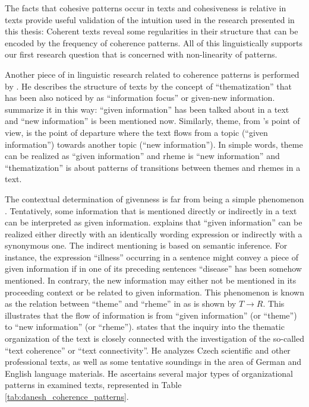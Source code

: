 The facts that cohesive patterns occur in texts and cohesiveness is relative in texts provide useful validation of the intuition used in the research presented in this thesis: Coherent texts reveal some regularities in their structure that can be encoded by the frequency of coherence patterns. 
All of this linguistically supports our first research question that is concerned with \mbox{non-linearity} of patterns. 

Another piece of in linguistic research related to coherence patterns is performed by . 
He describes the structure of texts by the concept  of ``thematization'' that has been also noticed by  as ``information focus'' or \mbox{given-new} information. 
 summarize it in this way: ``given information'' has been talked about in a text and ``new information'' is been mentioned now.  
Similarly, theme, from 's point of view, is the point of departure where the text flows from a topic (``given information'') towards another topic (``new information''). 
In simple words, theme can be realized as ``given information'' and rheme is ``new information'' and ``thematization'' is about patterns of transitions between themes and rhemes in a text. 

The contextual determination of givenness is far from being a simple phenomenon \cite{danes74a}. 
Tentatively, some information that is mentioned directly or indirectly in a text can be interpreted as given information. 
 explains that ``given information'' can be realized either directly with an identically wording expression or indirectly with a synonymous one.   
The indirect mentioning is based on semantic inference. 
For instance, the expression ``illness'' occurring in a sentence might convey a piece of given information if in one of its preceding sentences ``disease'' has been somehow mentioned. 
In contrary, the new information may either not be mentioned in its proceeding context or be related to given information. 
This phenomenon is known as the relation between ``theme'' and ``rheme'' in  as is shown by  $T \rightarrow R$. 
This illustrates that the flow of information is from ``given information'' (or ``theme'') to ``new information'' (or ``rheme'').
 states that the inquiry into the thematic organization of the text is closely connected with the investigation of the so-called ``text coherence'' or ``text connectivity''.
He analyzes Czech scientific and other professional texts, as well as some tentative soundings in the area of German and English language materials.
He ascertains several major types of organizational patterns in examined texts, represented in Table \ref{tab:danesh_coherence_patterns}. 


